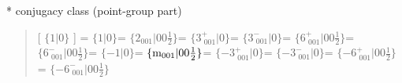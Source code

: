 \documentclass[fleqn,10pt,landscape]{jsarticle}
\begin{document}
* conjugacy class (point-group part)
\begin{quote}
[ $\{1|0\}$ ] = \quad $\{1|0\}$\newline[ $\{2{}_{001}|0 0 \frac{1}{2}\}$ ] = \quad $\{2{}_{001}|0 0 \frac{1}{2}\}$\newline[ $\{3^{+}_{\,\,001}|0\}$ ] = \quad $\{3^{+}_{\,\,001}|0\}$\newline[ $\{3^{-}_{\,\,001}|0\}$ ] = \quad $\{3^{-}_{\,\,001}|0\}$\newline[ $\{6^{+}_{\,\,001}|0 0 \frac{1}{2}\}$ ] = \quad $\{6^{+}_{\,\,001}|0 0 \frac{1}{2}\}$\newline[ $\{6^{-}_{\,\,001}|0 0 \frac{1}{2}\}$ ] = \quad $\{6^{-}_{\,\,001}|0 0 \frac{1}{2}\}$\newline[ $\{-1|0\}$ ] = \quad $\{-1|0\}$\newline[ $\{{\rm m}_{001}|0 0 \frac{1}{2}\}$ ] = \quad $\{{\rm m}_{001}|0 0 \frac{1}{2}\}$\newline[ $\{-3^{+}_{\,\,001}|0\}$ ] = \quad $\{-3^{+}_{\,\,001}|0\}$\newline[ $\{-3^{-}_{\,\,001}|0\}$ ] = \quad $\{-3^{-}_{\,\,001}|0\}$\newline[ $\{-6^{+}_{\,\,001}|0 0 \frac{1}{2}\}$ ] = \quad $\{-6^{+}_{\,\,001}|0 0 \frac{1}{2}\}$\newline[ $\{-6^{-}_{\,\,001}|0 0 \frac{1}{2}\}$ ] = \quad $\{-6^{-}_{\,\,001}|0 0 \frac{1}{2}\}$\newline
\end{quote}
\end{document}
